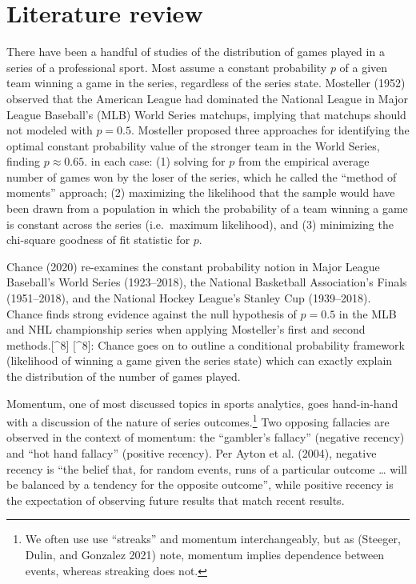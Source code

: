 \documentclass{article}
\begin{document}
\hypertarget{literature-review}{%
\section{Literature review}\label{literature-review}}

There have been a handful of studies of the distribution of games played
in a series of a professional sport. Most assume a constant probability
\(p\) of a given team winning a game in the series, regardless of the
series state. Mosteller (1952) observed that the American League had
dominated the National League in Major League Baseball's (MLB) World
Series matchups, implying that matchups should not modeled with
\(p = 0.5\). Mosteller proposed three approaches for identifying the
optimal constant probability value of the stronger team in the World
Series, finding \(p \approx 0.65\). in each case: (1) solving for \(p\)
from the empirical average number of games won by the loser of the
series, which he called the ``method of moments'' approach; (2)
maximizing the likelihood that the sample would have been drawn from a
population in which the probability of a team winning a game is constant
across the series (i.e.~maximum likelihood), and (3) minimizing the
chi-square goodness of fit statistic for \(p\).

Chance (2020) re-examines the constant probability notion in Major
League Baseball's World Series (1923--2018), the National Basketball
Association's Finals (1951--2018), and the National Hockey League's
Stanley Cup (1939--2018). Chance finds strong evidence against the null
hypothesis of \(p = 0.5\) in the MLB and NHL championship series when
applying Mosteller's first and second methods.{[}\^{}8{]} {[}\^{}8{]}:
Chance goes on to outline a conditional probability framework
(likelihood of winning a game given the series state) which can exactly
explain the distribution of the number of games played.

Momentum, one of most discussed topics in sports analytics, goes
hand-in-hand with a discussion of the nature of series
outcomes.\footnote{We often use use ``streaks'' and momentum
  interchangeably, but as (Steeger, Dulin, and Gonzalez 2021) note,
  momentum implies dependence between events, whereas streaking does
  not.} Two opposing fallacies are observed in the context of momentum:
the ``gambler's fallacy'' (negative recency) and ``hot hand fallacy''
(positive recency). Per Ayton et al. (2004), negative recency is ``the
belief that, for random events, runs of a particular outcome \ldots{}
will be balanced by a tendency for the opposite outcome'', while
positive recency is the expectation of observing future results that
match recent results.
\end{document}
